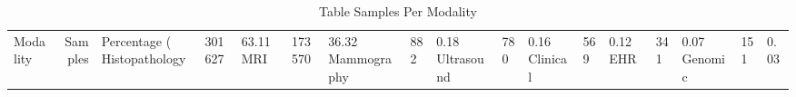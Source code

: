 \begin{table}
\caption{Table Samples Per Modality}
\begin{tabular}{lrllll}
\toprule
Modality & Samples & Percentage (%
\midrule
Histopathology & 301627 & 63.11%
MRI & 173570 & 36.32%
Mammography & 882 & 0.18%
Ultrasound & 780 & 0.16%
Clinical & 569 & 0.12%
EHR & 341 & 0.07%
Genomic & 151 & 0.03%
\bottomrule
\end{tabular}
\end{table}
